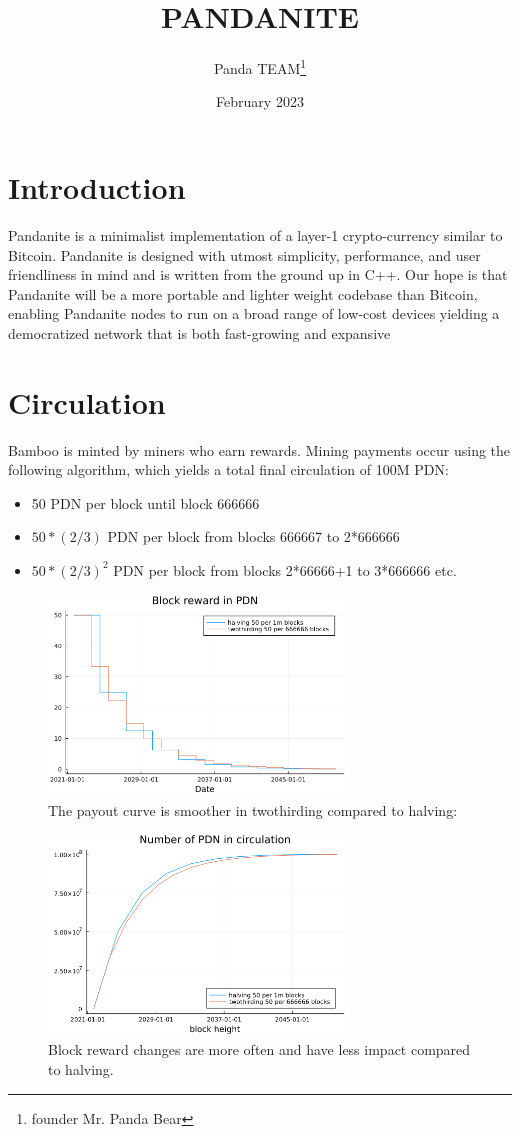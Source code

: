 \documentclass[11pt, a4paper]{elegantpaper}
\title{PANDANITE}
\author{Panda TEAM\thanks{founder Mr. Panda Bear}}
\date{February 2023}
\begin{document}
\maketitle

\section{Introduction}
Pandanite is a minimalist implementation of a layer-1 crypto-currency similar to Bitcoin. Pandanite is
designed with utmost simplicity, performance, and user friendliness in mind and is written from the
ground up in C++. Our hope is that Pandanite will be a more portable and lighter weight codebase
than Bitcoin, enabling Pandanite nodes to run on a broad range of low-cost devices yielding a
democratized network that is both fast-growing and expansive
\section{Circulation}
Bamboo is minted by miners who earn rewards. Mining payments occur using the following
algorithm, which yields a total final circulation of 100M PDN:
\begin{itemize}
	\item 50 PDN per block until block 666666
	\item $50*(2/3)$ PDN per block from blocks 666667 to 2*666666
	\item $50*(2/3)^2$ PDN per block from blocks 2*66666+1 to 3*666666 etc.
\end{itemize}
\begin{figure}[!h]
\includegraphics[width=8cm]{reward}
\centering
\caption{The payout curve is smoother in twothirding compared to halving:}
\end{figure}
\begin{figure}[!t]
\includegraphics[width=8cm]{circulation}
\centering
\caption{Block reward changes are more often and have less impact compared to halving.}
\end{figure}
\end{document}
